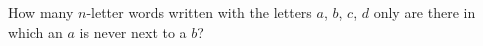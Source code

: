 How many $n$-letter words written with the letters $a$, $b$, $c$, $d$ only are there in which an $a$ is never next to a $b$?

